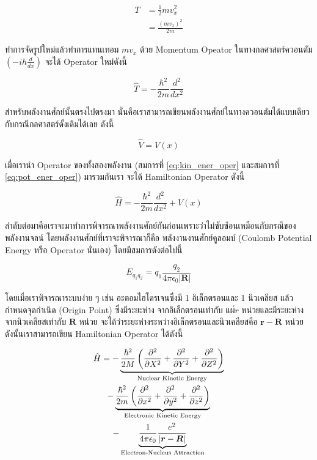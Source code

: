 \begin{align}
    T &= \frac{1}{2}mv^{2}_{x} \\
      &= \frac{(mv_{x})^{2}}{2m}
\end{align}

\noindent ทำการจัดรูปใหม่แล้วทำการแทนเทอม $mv_{x}$ ด้วย Momentum Opeator ในทางกลศาสตร์ควอนตัม $(-ih\frac{d}{dx})$ 
จะได้ Operator ใหม่ดังนี้

\begin{equation}\label{eq:kin_ener_oper}
    \hat{T} = -\frac{\hbar^{2}}{2m}\frac{d^{2}}{dx^{2}}
\end{equation}

สำหรับพลังงานศักย์นั้นตรงไปตรงมา นั่นคือเราสามารถเขียนพลังงานศักย์ในทางควอนตัมได้แบบเดียวกับกรณีกลศาสตร์ดั้งเดิมได้เลย ดังนี้

\begin{equation}\label{eq:pot_ener_oper}
    \hat{V} = V(x)
\end{equation}

เมื่อเรานำ Operator ของทั้งสองพลังงาน (สมการที่ \ref{eq:kin_ener_oper} และสมการที่ \ref{eq:pot_ener_oper}) มารวมกันเรา%
จะได้ Hamiltonian Operator ดังนี้

\begin{equation}
    \hat{H} = -\frac{\hbar^{2}}{2m}\frac{d^{2}}{dx^{2}} + V(x)
\end{equation}

ลำดับต่อมาคือเราจะมาทำการพิจารณาพลังงานศักย์กันก่อนเพราะว่าไม่ซับซ้อนเหมือนกับกรณีของพลังงานจลน์ โดยพลังงานศักย์ที่เราจะพิจารณาก็คือ%
พลังงานงานศักย์คูลอมบ์ (Coulomb Potential Energy หรือ Operator นั่นเอง) โดยมีสมการดังต่อไปนี้

\begin{equation}
    E_{q_{1}q_{2}} = q_{1}\frac{q_{2}}{4\pi\epsilon_{0}|\bm{R}|}
\end{equation}

โดยเมื่อเราพิจารณาระบบง่าย ๆ เช่น อะตอมไฮโดรเจนซึ่งมี 1 อิเล็กตรอนและ 1 นิวเคลียส แล้วกำหนดจุดกำเนิด (Origin Point) ซึ่งมีระยะห่าง%
จากอิเล็กตรอนเท่ากับ $แผ่{r}$ หน่วยและมีระยะห่างจากนิวเคลียสเท่ากับ $\bm{R}$ หน่วย จะได้ว่าระยะห่างระหว่างอิเล็กตรอนและนิวเคลียสคือ 
$\bm{r}-\bm{R}$ หน่วย ดังนั้นเราสามารถเขียน Hamiltonian Operator ได้ดังนี้

\begin{multline}\label{eq:hamil_hydrogen}
    \hat{H} = -\underbrace{\frac{\hbar^{2}}{2M} \left( \pdv[2]{X} + \pdv[2]{Y} + \pdv[2]{Z} \right)}_{%
                \text{Nuclear Kinetic Energy}} 
              \\
              -\underbrace{\frac{\hbar^{2}}{2m} \left( \pdv[2]{x} + \pdv[2]{y} + \pdv[2]{z} \right)}_{%
                \text{Electronic Kinetic Energy}}
              \\
              -\underbrace{\frac{1}{4\pi\epsilon_{0}}\frac{e^{2}}{|\bm{r}-\bm{R}|}}_{%
                \text{Electron-Nucleus Attraction}}
\end{multline}

